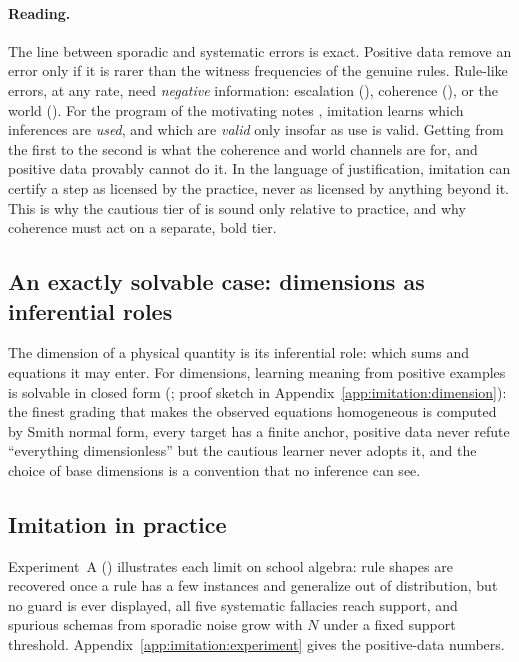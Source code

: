\paragraph{Reading.} The line between sporadic and systematic errors is exact. Positive data remove an error only if it is rarer than the witness frequencies of the genuine rules. Rule-like errors, at any rate, need \emph{negative} information: escalation (), coherence (), or the world (). For the program of the motivating notes \citep{hanni2026notes}, imitation learns which inferences are \emph{used}, and which are \emph{valid} only insofar as use is valid. Getting from the first to the second is what the coherence and world channels are for, and positive data provably cannot do it. In the language of justification, imitation can certify a step as licensed by the practice, never as licensed by anything beyond it. This is why the cautious tier of  is sound only relative to practice, and why coherence must act on a separate, bold tier.

\subsection{An exactly solvable case: dimensions as inferential roles}\label{sec:imitation:dimension}

The dimension of a physical quantity is its inferential role: which sums and equations it may enter. For dimensions, learning meaning from positive examples is solvable in closed form (; proof sketch in Appendix~\ref{app:imitation:dimension}): the finest grading that makes the observed equations homogeneous is computed by Smith normal form, every target has a finite anchor, positive data never refute ``everything dimensionless'' but the cautious learner never adopts it, and the choice of base dimensions is a convention that no inference can see.

\subsection{Imitation in practice}\label{sec:imitation:experiment}

Experiment~A () illustrates each limit on school algebra: rule shapes are recovered once a rule has a few instances and generalize out of distribution, but no guard is ever displayed, all five systematic fallacies reach support, and spurious schemas from sporadic noise grow with $N$ under a fixed support threshold. Appendix~\ref{app:imitation:experiment} gives the positive-data numbers.

